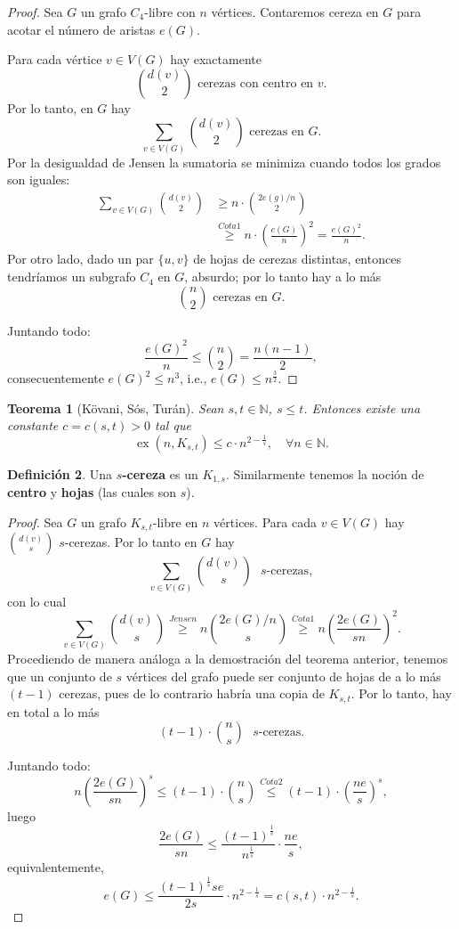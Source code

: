 \documentclass[12pt]{report}
\theoremstyle{plain}
\newtheorem{theorem}{Teorema}[section]
\theoremstyle{definition}
\newtheorem{definition}[theorem]{Definición}
\newcommand{\naturals}{\mathbb{N}}
\newcommand{\ex}[2]{\operatorname{ex} (#1, #2)}
\begin{document}
\begin{proof}
Sea $G$ un grafo $C_4$-libre con $n$ vértices. Contaremos cereza en $G$ para acotar el número de aristas $e(G)$.

Para cada vértice $v \in V(G)$ hay exactamente
\[
    \binom{d(v)}{2} \text{ cerezas con centro en $v$}.
\]
Por lo tanto, en $G$ hay
\[
    \sum_{v \in V(G)} \binom{d(v)}{2} \text{ cerezas en $G$}.
\]
Por la desigualdad de Jensen la sumatoria se minimiza cuando todos los grados son iguales:
\begin{align*}
    \sum_{v \in V(G)} \binom{d(v)}{2} &\geq n \cdot \binom{2 e(g) / n}{2} \\
                                        &\overset{Cota 1}{\geq} n \cdot \left ( \frac{e(G)}{n} \right )^2 = \frac{e(G)^2}{n}.
\end{align*}
Por otro lado, dado un par $\{u,v\}$ de hojas de cerezas distintas, entonces tendríamos un subgrafo $C_4$ en $G$, absurdo; por lo tanto hay a lo más
\[
    \binom{n} 2 \text{ cerezas en $G$}.
\]

Juntando todo:
\[
    \frac{e(G)^2}{n} \leq \binom n 2 = \frac{n(n-1)}{2},
\]
consecuentemente $e(G)^2 \leq n^3$, i.e., $e(G) \leq n^{\frac{3}{2}}$.
\end{proof}




\begin{theorem}[Kövani, Sós, Turán]
Sean $s, t \in \naturals$, $s \leq t$. Entonces existe una constante $c = c(s,t) > 0$ tal que
\[
    \ex n {K_{s,t}} \leq c \cdot n^{2 - \frac 1 s}, \quad \forall n \in \naturals.
\]
\end{theorem}

\begin{definition}
Una \textbf{$s$-cereza} es un $K_{1,s}$. Similarmente tenemos la noción de \textbf{centro} y \textbf{hojas} (las cuales son $s$).
\end{definition}

\begin{proof}
Sea $G$ un grafo $K_{s,t}$-libre en $n$ vértices. Para cada $v \in V(G)$ hay $\binom{d(v)}{s}$ $s$-cerezas. Por lo tanto en $G$ hay
\[
    \sum_{v \in V(G)} \binom{d(v)}{s} \text{ $s$-cerezas},
\]
con lo cual
\[
    \sum_{v\in V(G)} \binom{d(v)}{s} \overset{Jensen}\geq n \binom{2 e(G)/n}{s} \overset{Cota 1}\geq n \left( \frac{2 e (G)}{s n}\right)^2.
\]
Procediendo de manera análoga a la demostración del teorema anterior, tenemos que un conjunto de $s$ vértices del grafo puede ser conjunto de hojas de a lo más $(t-1)$ cerezas, pues de lo contrario habría una copia de $K_{s,t}$. Por lo tanto, hay en total a lo más
\[
    (t-1) \cdot \binom{n}s \text{ $s$-cerezas}.
\]

Juntando todo:
\[
    n ( \frac{2 e(G)}{s n})^s \leq (t-1) \cdot \binom n s \overset{Cota 2}{\leq} (t-1) \cdot (\frac{n e}{s})^s,
\]
luego
\[
    \frac{2 e(G)}{s n} \leq \frac{(t-1)^{\frac 1 s}}{n^{\frac 1 s}} \cdot \frac{n e}{s},
\]
equivalentemente,
\[
    e(G) \leq {\frac{(t-1)^{\frac 1 s} s e}{2 s}} \cdot n^{2-\frac{1}{s}} = c(s,t ) \cdot n ^{2 - \frac 1 s}.
\]
\end{proof}
\end{document}
